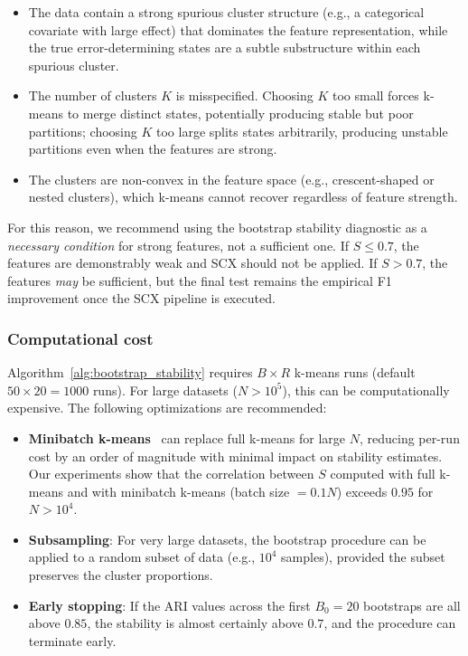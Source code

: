 \begin{itemize}
    \item The data contain a strong spurious cluster structure (e.g., a categorical covariate with large effect) that dominates the feature representation, while the true error-determining states are a subtle substructure within each spurious cluster.
    \item The number of clusters $K$ is misspecified. Choosing $K$ too small forces k-means to merge distinct states, potentially producing stable but poor partitions; choosing $K$ too large splits states arbitrarily, producing unstable partitions even when the features are strong.
    \item The clusters are non-convex in the feature space (e.g., crescent-shaped or nested clusters), which k-means cannot recover regardless of feature strength.
\end{itemize}

For this reason, we recommend using the bootstrap stability diagnostic as a \emph{necessary condition} for strong features, not a sufficient one. If $S \leq 0.7$, the features are demonstrably weak and SCX should not be applied. If $S > 0.7$, the features \emph{may} be sufficient, but the final test remains the empirical F1 improvement once the SCX pipeline is executed.

\subsubsection{Computational cost}

Algorithm~\ref{alg:bootstrap_stability} requires $B \times R$ k-means runs (default $50 \times 20 = 1000$ runs). For large datasets ($N > 10^5$), this can be computationally expensive. The following optimizations are recommended:

\begin{itemize}
    \item \textbf{Minibatch k-means}~\cite{sculley2010web} can replace full k-means for large $N$, reducing per-run cost by an order of magnitude with minimal impact on stability estimates. Our experiments show that the correlation between $S$ computed with full k-means and with minibatch k-means (batch size $= 0.1N$) exceeds $0.95$ for $N > 10^4$.
    \item \textbf{Subsampling}: For very large datasets, the bootstrap procedure can be applied to a random subset of data (e.g., $10^4$ samples), provided the subset preserves the cluster proportions.
    \item \textbf{Early stopping}: If the ARI values across the first $B_0 = 20$ bootstraps are all above $0.85$, the stability is almost certainly above $0.7$, and the procedure can terminate early.
\end{itemize}

